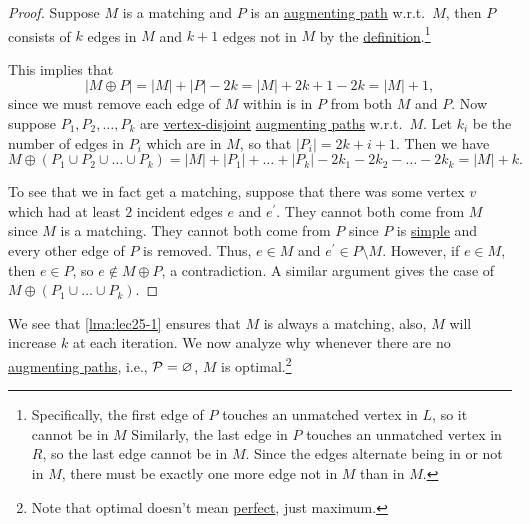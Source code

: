 \begin{proof}
	Suppose \(M\) is a matching and \(P\) is an \hyperref[def:augmenting-path]{augmenting path} w.r.t.\ \(M\), then \(P\) consists of \(k\) edges in \(M\) and \(k+1\) edges not in \(M\) by the \hyperref[def:augmenting-path]{definition}.\footnote{Specifically, the first edge of \(P\) touches an unmatched vertex in \(L\), so it cannot be in \(M\) Similarly, the last edge in \(P\) touches an unmatched vertex in \(R\), so the last edge cannot be in \(M\). Since the edges alternate being in or not in \(M\), there must be exactly one more edge not in \(M\) than in \(M\).}

	This implies that
	\[
		\left\vert M\oplus P \right\vert = \left\vert M \right\vert + \left\vert P \right\vert - 2k = \left\vert M \right\vert + 2k + 1 - 2k = \left\vert M \right\vert + 1,
	\]
	since we must remove each edge of \(M\) within is in \(P\) from both \(M\) and \(P\). Now suppose \(P_1, P_2, \ldots  , P_k\) are \hyperref[def:vertex-independent]{vertex-disjoint} \hyperref[def:augmenting-path]{augmenting paths} w.r.t.\ \(M\). Let \(k_i\) be the number of edges in \(P_{i} \) which are in \(M\), so that \(\left\vert P_{i}  \right\vert = 2k + i + 1\). Then we have
	\[
		M \oplus (P_1 \cup P_2 \cup  \ldots  \cup P_k)= \left\vert M \right\vert + \left\vert P_1 \right\vert + \ldots  + \left\vert P_k \right\vert
		- 2k_1 - 2k_2 - \ldots  - 2k_k = \left\vert M \right\vert + k.
	\]

	To see that we in fact get a matching, suppose that there was some vertex \(v\) which had at least \(2\) incident edges \(e\) and \(e^\prime \). They cannot both come from \(M\) since \(M\) is a matching. They cannot both come from \(P\) since \(P\) is \hyperref[def:simple-path]{simple} and every other edge of \(P\) is removed. Thus, \(e\in M\) and \(e^\prime \in P\setminus M\). However, if \(e\in M\), then \(e\in P\), so \(e \notin M\oplus P\), a contradiction. A similar argument gives the case of \(M\oplus (P_1 \cup \ldots \cup P_k )\).
\end{proof}

We see that \autoref{lma:lec25-1} ensures that \(M\) is always a matching, also, \(M\) will increase \(k\) at each iteration. We now analyze why whenever there are no \hyperref[def:augmenting-path]{augmenting paths}, i.e., \(\mathcal{\MakeUppercase{p}} = \varnothing \), \(M\) is optimal.\footnote{Note that optimal doesn't mean \hyperref[def:perfect-matching]{perfect}, just maximum.}

